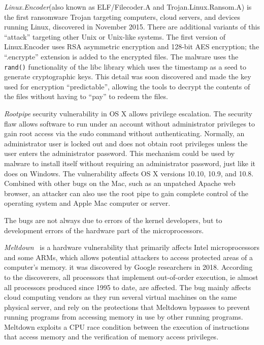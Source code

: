\documentclass{masterthesis}
\begin{document}
\emph{Linux.Encoder}(also known as ELF/Filecoder.A and Trojan.Linux.Ransom.A) is the first ransomware Trojan targeting computers, cloud servers, and devices running Linux, discovered in November 2015. There are additional variants of this ``attack'' targeting other Unix or Unix-like systems.
The first version of Linux.Encoder uses RSA asymmetric encryption and 128-bit AES encryption; the ``.encrypte'' extension is added to the encrypted files.
The malware uses the \texttt{rand()} functionality of the  libc library which uses the timestamp as a seed to generate cryptographic keys.
This detail was soon discovered and made the key used for encryption ``predictable'', allowing the tools to decrypt the contents of the files without having to ``pay'' to redeem the files.

\emph{Rootpipe} security vulnerability in OS X allows privilege escalation.
The security flaw allows software to run under an account without administrator privileges to gain root access via the sudo command without authenticating. Normally, an administrator user is locked out and does not obtain root privileges unless the user enters the administrator password.
This mechanism could be used by malware to install itself without requiring an administrator password, just like it does on Windows. The vulnerability affects OS X versions 10.10, 10.9, and 10.8.
Combined with other bugs on the Mac, such as an unpatched Apache web browser, an attacker can also use the root pipe to gain complete control of the operating system and Apple Mac computer or server.

The bugs are not always due to errors of the kernel developers, but to development errors of the hardware part of the microprocessors.

\emph{Meltdown}~\cite{lipp2018meltdown} is a hardware vulnerability that primarily affects Intel microprocessors and some ARMs, which allows potential attackers to access protected areas of a computer's memory.
it was discovered by Google researchers in 2018. According to the discoverers, all processors that implement out-of-order execution, ie almost all processors produced since 1995 to date, are affected.
The bug mainly affects cloud computing vendors as they run several virtual machines on the same physical server, and rely on the protections that Meltdown bypasses to prevent running programs from accessing memory in use by other running programs.
Meltdown exploits a CPU race condition between the execution of instructions that access memory and the verification of memory access privileges.
\end{document}
